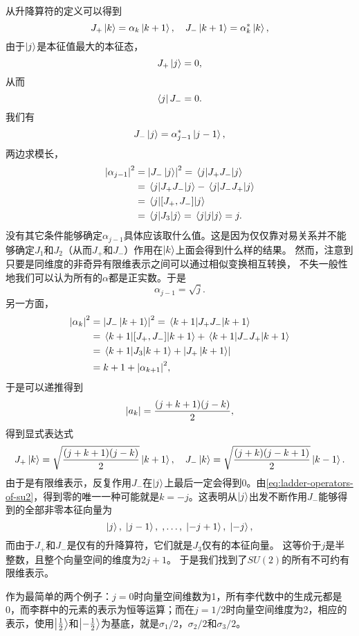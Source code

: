 从升降算符的定义可以得到
\[
    J_+ \ket{k} = \alpha_k \ket{k+1}, \quad J_- \ket{k+1} = \alpha_k^* \ket{k},
\]
由于$\ket{j}$是本征值最大的本征态，
\[
    J_+ \ket{j} = 0,
\]
从而
\[
    \bra{j} J_- = 0.
\]
我们有
\[
    J_- \ket{j} = \alpha_{j-1}^* \ket{j-1},
\]
两边求模长，
\[
    \begin{aligned}
        \abs{\alpha_{j-1}}^2 &= \abs{J_- \ket{j}}^2 = \mel{j}{J_+ J_-}{j} \\
        &= \mel{j}{J_+ J_-}{j} - \mel{j}{J_- J_+}{j} \\
        &= \mel{j}{[J_+, J_-]}{j} \\
        &= \mel{j}{J_3}{j} = \mel{j}{j}{j} = j.
    \end{aligned}
\]
没有其它条件能够确定$\alpha_{j-1}$具体应该取什么值。这是因为仅仅靠对易关系并不能够确定$J_1$和$J_2$（从而$J_+$和$J_-$）作用在$\ket{k}$上面会得到什么样的结果。
然而，注意到只要是同维度的非奇异有限维表示之间可以通过相似变换相互转换，%
不失一般性地我们可以认为所有的$\alpha$都是正实数。于是
\[
    \alpha_{j-1} = \sqrt{j}.
\]
另一方面，
\[
    \begin{aligned}
        \abs{\alpha_k}^2 &= \abs{J_- \ket{k+1}}^2 = \mel{k+1}{J_+ J_-}{k+1} \\
        &= \mel{k+1}{[J_+, J_-]}{k+1} + \mel{k+1}{J_- J_+}{k+1} \\
        &= \mel{k+1}{J_3}{k+1} + \abs{J_+ \ket{k+1}} \\
        &= k+1 + \abs{\alpha_{k+1}}^2,
    \end{aligned} 
\]
于是可以递推得到
\[
    \abs{a_k} = \frac{(j+k+1)(j-k)}{2},
\]
得到显式表达式
\begin{equation}
    J_+ \ket{k} = \sqrt{\frac{(j+k+1)(j-k)}{2}} \ket{k+1}, \quad J_- \ket{k} = \sqrt{\frac{(j+k)(j-k+1)}{2}} \ket{k-1}.
    \label{eq:ladder-operators-of-su2}
\end{equation}
由于是有限维表示，反复作用$J_-$在$\ket{j}$上最后一定会得到$0$。由\eqref{eq:ladder-operators-of-su2}，得到零的唯一一种可能就是$k=-j$。这表明从$\ket{j}$出发不断作用$J_-$能够得到的全部非零本征向量为
\[
    \ket{j}, \; \ket{j-1}, \; , \ldots, \; \ket{-j+1}, \; \ket{-j},
\]
而由于$J_+$和$J_-$是仅有的升降算符，它们就是$J_3$仅有的本征向量。
这等价于$j$是半整数，且整个向量空间的维度为$2j+1$。
于是我们找到了$SU(2)$的所有不可约有限维表示。

作为最简单的两个例子：$j=0$时向量空间维数为1，所有李代数中的生成元都是0，而李群中的元素的表示为恒等运算；而在$j=1/2$时向量空间维度为2，相应的表示，使用$\ket{\frac{1}{2}}$和$\ket{-\frac{1}{2}}$为基底，就是$\sigma_1 / 2$，$\sigma_2 / 2$和$\sigma_3 / 2$。

